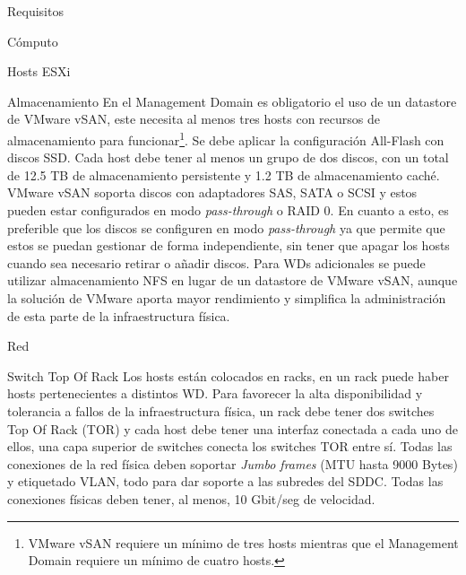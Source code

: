 \begin{section}{Requisitos}
\begin{subsection}{Cómputo}
\begin{subsubsection}{Hosts ESXi}
\end{subsubsection}
\end{subsection}
\begin{subsection}{Almacenamiento}
    En el Management Domain es obligatorio el uso de un datastore de VMware vSAN, este necesita al menos tres hosts con recursos de almacenamiento para funcionar\footnote{VMware vSAN requiere un mínimo de tres hosts mientras que el Management Domain requiere un mínimo de cuatro hosts.}. Se debe aplicar la configuración All-Flash con discos SSD. Cada host debe tener al menos un grupo de dos discos, con un total de 12.5 TB de almacenamiento persistente y 1.2 TB de almacenamiento caché. VMware vSAN soporta discos con adaptadores SAS, SATA o SCSI y estos pueden estar configurados en modo \textit{pass-through} o RAID 0. En cuanto a esto, es preferible que los discos se configuren en modo \textit{pass-through} ya que permite que estos se puedan gestionar de forma independiente, sin tener que apagar los hosts cuando sea necesario retirar o añadir discos.
    Para WDs adicionales se puede utilizar almacenamiento NFS en lugar de un datastore de VMware vSAN, aunque la solución de VMware aporta mayor rendimiento y simplifica la administración de esta parte de la infraestructura física.
\end{subsection}
\begin{subsection}{Red}
 \begin{subsubsection}{Switch Top Of Rack}
     Los hosts están colocados en racks, en un rack puede haber hosts pertenecientes a distintos WD. Para favorecer la alta disponibilidad y tolerancia a fallos de la infraestructura física, un rack debe tener dos switches Top Of Rack (TOR) y cada host debe tener una interfaz conectada a cada uno de ellos, una capa superior de switches conecta los switches TOR entre sí. Todas las conexiones de la red física deben soportar \textit{Jumbo frames} (MTU hasta 9000 Bytes) y etiquetado VLAN, todo para dar soporte a las subredes del SDDC. Todas las conexiones físicas deben tener, al menos, 10 Gbit/seg de velocidad.

\end{subsubsection}
\end{subsection}
\end{section}
